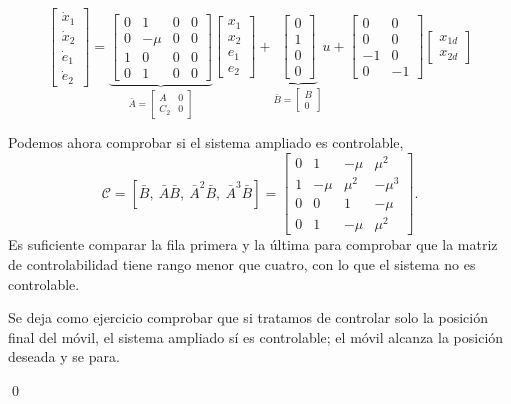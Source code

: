 \begin{example}
\begin{equation*}
\begin{bmatrix}
\dot x_1 \\
\dot x_2\\
\dot e_1\\
\dot e_2
\end{bmatrix} =
\underbrace{
\begin{bmatrix}
0 & 1 &0 & 0\\
0 & -\mu & 0 & 0\\
1 & 0 &0 &0\\
0 &1 &0 & 0
\end{bmatrix}}_{\bar{A}=\begin{bmatrix}
A & 0\\
C_2 & 0
\end{bmatrix}}
\begin{bmatrix}
x_1 \\
x_2\\
e_1\\
e_2
\end{bmatrix} + 
\underbrace{\begin{bmatrix}
0 \\
1\\
0\\
0
\end{bmatrix}}_{\bar{B}=\begin{bmatrix}B\\ 0
\end{bmatrix}}u+
\begin{bmatrix}
0 &0 \\
0 & 0\\
-1 & 0\\
0 &-1
\end{bmatrix}
\begin{bmatrix}
x_{1d}\\x_{2d}
\end{bmatrix}
\end{equation*}

Podemos ahora comprobar si el sistema ampliado es controlable,
\begin{equation*}
\mathcal{C} = [\bar{B},\ \bar{A} \bar{B},\ \bar{A}^2\bar{B},\ \bar{A}^3\bar{B}]  = 
\begin{bmatrix}
0 & 1 & -\mu & \mu^2\\
1& -\mu & \mu^2 & -\mu^3\\
0 & 0 & 1 & -\mu\\
0 & 1 & -\mu & \mu^2
\end{bmatrix}.
\end{equation*}
Es suficiente comparar la fila primera y la última para comprobar que la matriz de controlabilidad tiene rango menor que cuatro, con lo que el sistema no es controlable.

Se deja como ejercicio comprobar que si tratamos de controlar solo la posición final del móvil, el sistema ampliado sí es controlable; el móvil alcanza la posición deseada y se para.

\qed
\end{example}





 



